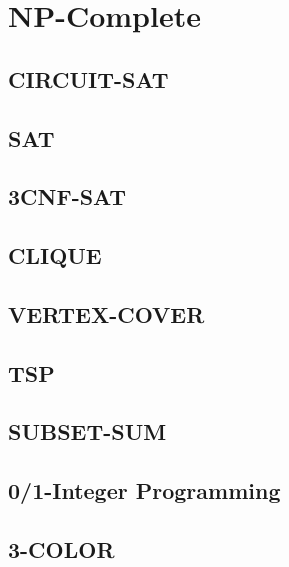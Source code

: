\chapter{NP-Complete}

\section{CIRCUIT-SAT}

\section{SAT}

\section{3CNF-SAT}

\section{CLIQUE}

\section{VERTEX-COVER}

\section{TSP}

\section{SUBSET-SUM}

\section{0/1-Integer Programming}

\section{3-COLOR}

